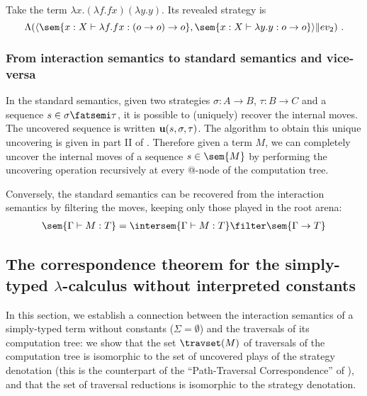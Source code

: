 \begin{example}
Take the term $\lambda x . (\lambda f . f x) (\lambda y . y)$.
Its revealed strategy is $$\Lambda ( \langle \sem{ x:X \vdash \lambda f . f
x : (o\rightarrow o) \rightarrow o} , \sem{ x:X \vdash \lambda y . y
: o \rightarrow o} \rangle \| ev_2 ) \ .$$
\end{example}


\subsubsection{From interaction semantics to standard semantics and vice-versa}

In the standard semantics, given two strategies $\sigma : A
\rightarrow B$, $\tau : B \rightarrow C$ and a sequence $s \in
\sigma \fatsemi \tau$, it is possible to (uniquely) recover the
internal moves. The uncovered sequence is written ${\bf u}(s,
\sigma, \tau)$. The algorithm to obtain this unique uncovering is
given in part II of \cite{hylandong_pcf}. Therefore given a term
$M$, we can completely uncover the internal moves of a sequence
$s\in\sem{M}$ by performing the uncovering operation recursively at
every @-node of the computation tree.

Conversely, the standard semantics can be recovered from the
interaction semantics by filtering the moves, keeping only those
played in the root arena:
\begin{eqnarray}
 \sem{\Gamma \vdash M : T} = \intersem{\Gamma \vdash M : T} \filter \sem{\Gamma \rightarrow T} \label{eqn:int_std_gamsem}
\end{eqnarray}

\subsection{The correspondence theorem for the simply-typed $\lambda$-calculus without interpreted constants}
In this section, we establish a connection between the interaction
semantics of a simply-typed term without constants ($\Sigma =
\emptyset$) and the traversals of its computation tree: we show that
the set $\travset(M)$ of traversals of the computation tree is
isomorphic to the set of uncovered plays of the strategy denotation
(this is the counterpart of the ``Path-Traversal Correspondence'' of
\cite{OngLics2006}), and that the set of traversal reductions is
isomorphic to the strategy denotation.

